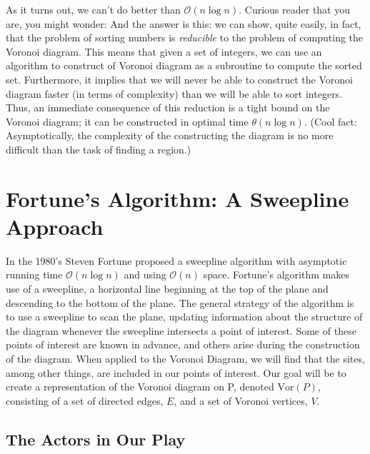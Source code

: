 \documentclass[12pt,twoside]{reedthesis}
\begin{document}
    As it turns out, we can't do better than $\mathcal{O}(n\log n)$. Curious reader that you are, you might wonder:  And the answer is this: we can show, quite easily, in fact, that the problem of sorting numbers is \emph{reducible} to the problem of computing the Voronoi diagram. This means that given a set of integers, we can use an algorithm to construct of Voronoi diagram as a subroutine to compute the sorted set. Furthermore, it implies that we will never be able to construct the Voronoi diagram faster (in terms of complexity) than we will be able to sort integers. Thus, an immediate consequence of this reduction is a tight bound on the Voronoi diagram; it can be constructed in optimal time $\theta(n\log n)$. (Cool fact: Asymptotically, the complexity of the constructing the diagram is no more difficult than the task of finding a region.)\par
  

  \section{Fortune's Algorithm: A Sweepline Approach} %
  \label{sec:fortune_s_algorithm}
    In the 1980's Steven Fortune proposed a sweepline algorithm with asymptotic running time $\mathcal{O}(n\log n)$ and using $\mathcal{O}(n)$ space. Fortune's algorithm makes use of a sweepline, a horizontal line beginning at the top of the plane and descending to the bottom of the plane. The general strategy of the algorithm is to use a sweepline to scan the plane, updating information about the structure of the diagram whenever the sweepline intersects a point of interest. Some of these points of interest are known in advance, and others arise during the construction of the diagram. When applied to the Voronoi Diagram, we will find that the sites, among other things, are included in our points of interest. Our goal will be to create a representation of the Voronoi diagram on P, denoted $\mbox{Vor}(P)$, consisting of a set of directed edges, $E$, and a set of Voronoi vertices, $V$.

    \subsection{The Actors in Our Play} %
    \label{sub:the_actors_in_our_play}

\end{document}
